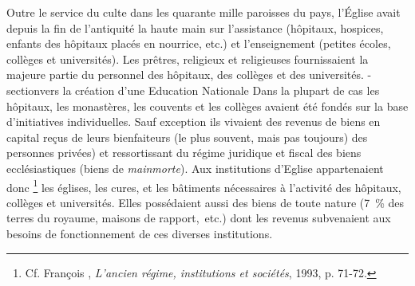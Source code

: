  Outre le service du culte dans les quarante mille paroisses du pays, l'Église avait  depuis la fin de l'antiquité la haute main sur l'assistance (hôpitaux, hospices, enfants des hôpitaux placés en nourrice, etc.) et l'enseignement (petites écoles, collèges et universités). Les prêtres, religieux et religieuses fournissaient la majeure partie du personnel des hôpitaux, des collèges et des universités. 
 \sous-section{vers la création d'une Education Nationale}
 Dans la plupart de cas les hôpitaux, les monastères, les couvents et les collèges avaient été fondés sur la base d'initiatives individuelles. Sauf exception ils vivaient des revenus de biens en capital reçus de leurs bienfaiteurs (le plus souvent, mais pas toujours) des personnes privées) et ressortissant du régime juridique et fiscal des biens ecclésiastiques (biens de \emph{mainmorte}). Aux institutions d'Eglise appartenaient donc%
\footnote{Cf. François , \emph{L'ancien régime, institutions et sociétés}, 1993, p. 71-72.} 
les églises, les cures, et les bâtiments nécessaires à l'activité des hôpitaux, collèges et universités. Elles possédaient aussi des biens de toute nature (7~\% des terres du royaume, maisons de rapport,~etc.) dont les revenus subvenaient aux besoins de fonctionnement de ces diverses institutions. 

